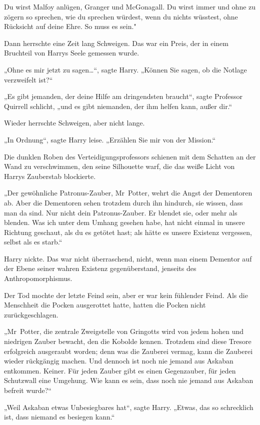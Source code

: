{Du wirst Malfoy anlügen, Granger und McGonagall. Du wirst immer und ohne zu zögern so sprechen, wie du sprechen würdest, wenn du nichts wüsstest, ohne Rücksicht auf deine Ehre. So muss es sein."

Dann herrschte eine Zeit lang Schweigen. Das war ein Preis, der in einem Bruchteil von Harrys Seele gemessen wurde.

„Ohne es mir jetzt zu sagen…“, sagte Harry. „Können Sie sagen, ob die Notlage verzweifelt ist?“

„Es gibt jemanden, der deine Hilfe am dringendsten braucht“, sagte Professor Quirrell schlicht, „und es gibt niemanden, der ihm helfen kann, außer dir.“

Wieder herrschte Schweigen, aber nicht lange.

„In Ordnung“, sagte Harry leise. „Erzählen Sie mir von der Mission.“

Die dunklen Roben des Verteidigungsprofessors schienen mit dem Schatten an der Wand zu verschwimmen, den seine Silhouette warf, die das weiße Licht von Harrys Zauberstab blockierte.

„Der gewöhnliche Patronus-Zauber, Mr~Potter, wehrt die Angst der Dementoren ab. Aber die Dementoren sehen trotzdem durch ihn hindurch, sie wissen, dass man da sind. Nur nicht dein Patronus-Zauber. Er blendet sie, oder mehr als blenden. Was ich unter dem Umhang gesehen habe, hat nicht einmal in unsere Richtung geschaut, als du es getötet hast; als hätte es unsere Existenz vergessen, selbst als es starb.“

Harry nickte. Das war nicht überraschend, nicht, wenn man einem Dementor auf der Ebene seiner wahren Existenz gegenüberstand, jenseits des Anthropomorphismus.

Der Tod mochte der letzte Feind sein, aber er war kein fühlender Feind. Als die Menschheit die Pocken ausgerottet hatte, hatten die Pocken nicht zurückgeschlagen.

„Mr~Potter, die zentrale Zweigstelle von Gringotts wird von jedem hohen und niedrigen Zauber bewacht, den die Kobolde kennen. Trotzdem sind diese Tresore erfolgreich ausgeraubt worden; denn was die Zauberei vermag, kann die Zauberei wieder rückgängig machen. Und dennoch ist noch nie jemand aus Askaban entkommen. Keiner. Für jeden Zauber gibt es einen Gegenzauber, für jeden Schutzwall eine Umgehung. Wie kann es sein, dass noch nie jemand aus Askaban befreit wurde?“

„Weil Askaban etwas Unbesiegbares hat“, sagte Harry. „Etwas, das so schrecklich ist, dass niemand es besiegen kann.“

}
